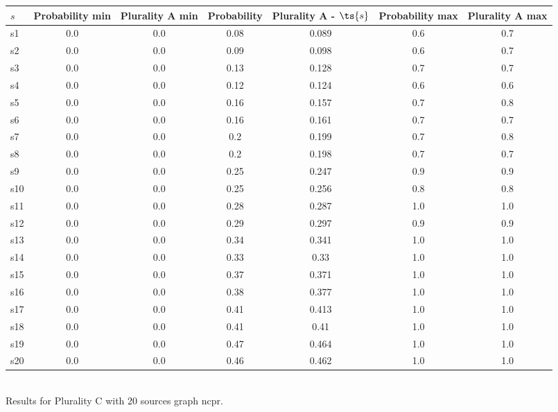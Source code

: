 \documentclass{article}
\begin{document}
\noindent\begin{tabular}{|l|c|c|c|c|c|c|}
\hline
$s$& Probability min & Plurality A min & Probability & Plurality A - $\ts{s}$ & Probability max & Plurality A max\\
\hline
s1 &0.0 & 0.0 & 0.08 & 0.089 & 0.6 & 0.7\\
\hline
s2 &0.0 & 0.0 & 0.09 & 0.098 & 0.6 & 0.7\\
\hline
s3 &0.0 & 0.0 & 0.13 & 0.128 & 0.7 & 0.7\\
\hline
s4 &0.0 & 0.0 & 0.12 & 0.124 & 0.6 & 0.6\\
\hline
s5 &0.0 & 0.0 & 0.16 & 0.157 & 0.7 & 0.8\\
\hline
s6 &0.0 & 0.0 & 0.16 & 0.161 & 0.7 & 0.7\\
\hline
s7 &0.0 & 0.0 & 0.2 & 0.199 & 0.7 & 0.8\\
\hline
s8 &0.0 & 0.0 & 0.2 & 0.198 & 0.7 & 0.7\\
\hline
s9 &0.0 & 0.0 & 0.25 & 0.247 & 0.9 & 0.9\\
\hline
s10 &0.0 & 0.0 & 0.25 & 0.256 & 0.8 & 0.8\\
\hline
s11 &0.0 & 0.0 & 0.28 & 0.287 & 1.0 & 1.0\\
\hline
s12 &0.0 & 0.0 & 0.29 & 0.297 & 0.9 & 0.9\\
\hline
s13 &0.0 & 0.0 & 0.34 & 0.341 & 1.0 & 1.0\\
\hline
s14 &0.0 & 0.0 & 0.33 & 0.33 & 1.0 & 1.0\\
\hline
s15 &0.0 & 0.0 & 0.37 & 0.371 & 1.0 & 1.0\\
\hline
s16 &0.0 & 0.0 & 0.38 & 0.377 & 1.0 & 1.0\\
\hline
s17 &0.0 & 0.0 & 0.41 & 0.413 & 1.0 & 1.0\\
\hline
s18 &0.0 & 0.0 & 0.41 & 0.41 & 1.0 & 1.0\\
\hline
s19 &0.0 & 0.0 & 0.47 & 0.464 & 1.0 & 1.0\\
\hline
s20 &0.0 & 0.0 & 0.46 & 0.462 & 1.0 & 1.0\\
\hline
\end{tabular}\\

\noindent Results for Plurality C with 20 sources graph ncpr.
\end{document}
